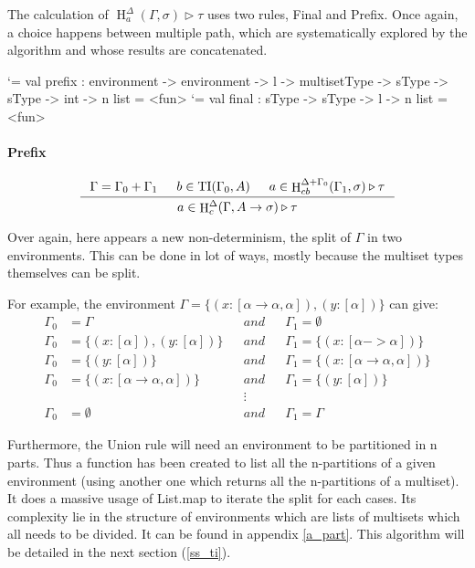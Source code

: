 \documentclass{article}
\let\origlstlisting=\lstlisting
\let\endoriglstlisting=\endlstlisting
\renewenvironment{lstlisting}
{\mathcode`\-=\hyphenmathcode
    \everymath{}\mathsurround=0pt\origlstlisting}
{\endoriglstlisting}
\DeclareMathOperator{\iH}{H}
\DeclareMathOperator{\iTI}{TI}
\begin{document}
The calculation of $\iH^\Delta_a(\Gamma, \sigma) \triangleright \tau$ uses two rules, Final and Prefix. Once again, a choice happens between multiple path, which are systematically explored by the algorithm and whose results are concatenated. 

\begin{lstlisting}[frame=single]
val prefix : environment -> environment -> l
-> multisetType -> sType -> sType -> int -> n list = <fun>
\end{lstlisting}
\begin{lstlisting}[frame=single]
val final : sType -> sType -> l -> n list = <fun>
\end{lstlisting}

\paragraph{Prefix}
\begin{displaymath}
\inference[]{\Gamma = \Gamma_0 + \Gamma_1 & b \in \iTI(\Gamma_0, A) & a \in \iH^{\Delta + \Gamma_0}_{cb}(\Gamma_1, \sigma) \triangleright \tau}{a \in \iH^{\Delta}_c(\Gamma, A \rightarrow \sigma) \triangleright \tau}
\end{displaymath}

Over again, here appears a new non-determinism, the split of $\Gamma$ in two environments. This can be done in lot of ways, mostly because the multiset types themselves can be split.

For example, the environment $\Gamma = \{(x : [\alpha \rightarrow \alpha, \alpha]), (y : [\alpha])\}$ can give:
\begin{align*}
   \Gamma_0 &= \Gamma &&and&& \Gamma_1 = \emptyset
   \\\Gamma_0 &= \{(x:[\alpha]), (y:[\alpha])\} &&and&& \Gamma_1 = \{(x:[\alpha -> \alpha])\}
   \\\Gamma_0 &= \{(y:[\alpha])\} &&and&& \Gamma_1 = \{(x : [\alpha \rightarrow \alpha, \alpha])\}
   \\\Gamma_0 &= \{(x : [\alpha \rightarrow \alpha, \alpha])\} &&and&& \Gamma_1 = \{(y:[\alpha])\}
   \\&&&\vdots&&
   \\\Gamma_0 &= \emptyset &&and&& \Gamma_1 = \Gamma
\end{align*}

Furthermore, the Union rule will need an environment to be partitioned in n parts. Thus a function has been created to list all the n-partitions of a given environment (using another one which returns all the n-partitions of a multiset). It does a massive usage of List.map to iterate the split for each cases. Its complexity lie in the structure of environments which are lists of multisets which all needs to be divided. It can be found in appendix \ref{a_part}. This algorithm will be detailed in the next section (\ref{ss_ti}).
\end{document}
